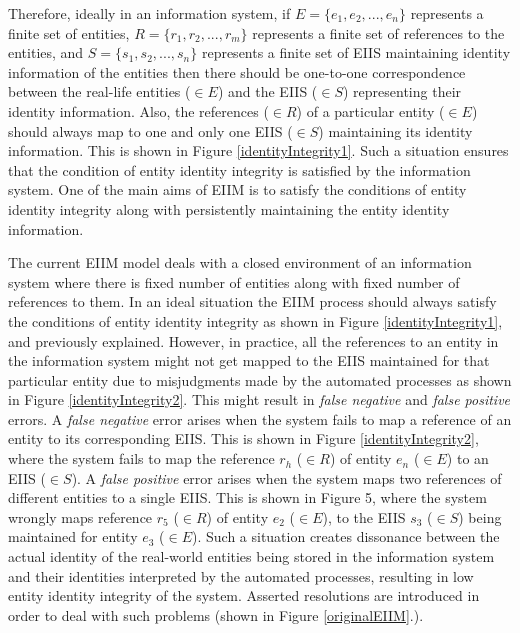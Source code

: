 Therefore, ideally in an information system, if $E = \{e_{1},e_{2}, ... ,e_{n}\}$ represents a finite set of entities, $R = \{r_{1},r_{2}, ... ,r_{m}\}$ represents a finite set of references to the entities, and $S = \{s_{1},s_{2}, ... ,s_{n}\}$ represents a finite set of EIIS maintaining identity information of the entities then there should be one-to-one correspondence between the real-life entities ($\in E$) and the EIIS ($\in S$) representing their identity information. Also, the references ($\in R$) of a particular entity ($\in E$) should always map to one and only one EIIS ($\in S$) maintaining its identity information. This is shown in Figure \ref{identityIntegrity1}. Such a situation ensures that the condition of entity identity integrity is satisfied by the information system. One of the main aims of EIIM is to satisfy the conditions of entity identity integrity along with persistently maintaining the entity identity information.

The current EIIM model deals with a closed environment of an information system where there is fixed number of entities along with fixed number of references to them. In an ideal situation the EIIM process should always satisfy the conditions of entity identity integrity as shown in Figure \ref{identityIntegrity1}, and previously explained. However, in practice, all the references to an entity in the information system might not get mapped to the EIIS maintained for that particular entity due to misjudgments made by the automated processes as shown in Figure \ref{identityIntegrity2}. This might result in \textit{false negative} and \textit{false positive} errors. A \textit{false negative} error arises when the system fails to map a reference of an entity to its corresponding EIIS. This is shown in Figure \ref{identityIntegrity2}, where the system fails to map the reference $r_{h}$ ($\in R$) of entity $e_{n}$ ($\in E$) to an EIIS ($\in S$). A \textit{false positive} error arises when the system maps two references of different entities to a single EIIS. This is shown in Figure 5, where the system wrongly maps reference $r_{5}$ ($\in R$) of entity $e_{2}$ ($\in E$), to the EIIS $s_{3}$ ($\in S$) being maintained for entity $e_{3}$ ($\in E$). Such a situation creates dissonance between the actual identity of the real-world entities being stored in the information system and their identities interpreted by the automated processes, resulting in low entity identity integrity of the system. Asserted resolutions are introduced in order to deal with such problems (shown in Figure \ref{originalEIIM}.).

